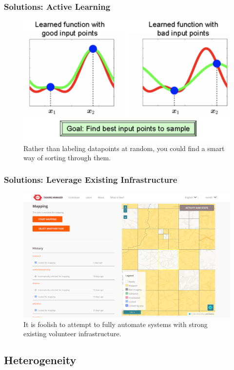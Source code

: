 \documentclass[10pt,mathserif]{beamer}
\begin{document}
\begin{frame}
  \frametitle{Solutions: Active Learning}
  \begin{figure}[ht]
    \centering
    \includegraphics[options]{figures/active_learning}
    \caption{Rather than labeling datapoints at random, you could find a smart
      way of sorting through them. \label{fig:label} }
  \end{figure}
\end{frame}

\begin{frame}
  \frametitle{Solutions: Leverage Existing Infrastructure}
  \begin{figure}[ht]
    \centering
    \includegraphics[options]{figures/hotosm}
    \caption{It is foolish to attempt to fully automate systems with strong
      existing volunteer infrastructure. \label{fig:label} }
  \end{figure}
\end{frame}

\subsection{Heterogeneity}
\label{subsec:label}
\end{document}
